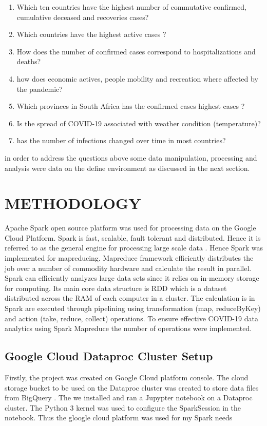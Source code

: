 \documentclass[12pt,letterpaper, twoside]{article}
\begin{document}
\begin{enumerate}
    \item Which  ten countries have the highest number of commutative confirmed, cumulative deceased and recoveries cases?
    \item  Which countries have the highest active cases ?
    \item How does the number of confirmed cases correspond to hospitalizations and deaths?
    \item how does economic actives, people mobility and recreation where affected by the pandemic?
    \item Which provinces in South Africa has the  confirmed cases highest cases ?
    \item Is the spread of COVID-19 associated with weather condition (temperature)?
    \item has the number of infections changed over time in most countries?
\end{enumerate}

in order to address the questions above  some  data manipulation, processing and analysis were data on the define environment as discussed in the next section.

\section{METHODOLOGY}
Apache Spark open source platform was used for processing data on the Google Cloud Platform. Spark is fast, scalable, fault tolerant and distributed. Hence it is referred to as the general engine for processing large scale data  \cite{Chouksey and Chauhan, 2017}. Hence Spark was implemented for mapreducing. Mapreduce framework efficiently distributes the job over a number of commodity hardware and calculate the result in parallel. Spark can efficiently analyzes large data sets since it relies on in-memory storage for computing. Its main core data structure is RDD which is a dataset distributed across the RAM  of each computer in a cluster. The calculation is in Spark are executed through pipelining using transformation (map, reduceByKey) and action (take, reduce, collect) operations. To ensure effective COVID-19 data analytics using Spark Mapreduce the number of operations were implemented.

\subsection{ Google Cloud Dataproc Cluster Setup}
Firstly, the project was created on Google Cloud platform console. The cloud storage bucket to be used on the Dataproc cluster was created to store data files from BigQuery . The we installed and ran a Jupypter notebook on a Dataproc cluster. The Python 3 kernel was used to configure the SparkSession in the notebook.  Thus the gloogle cloud platform was used for my Spark needs
\end{document}
